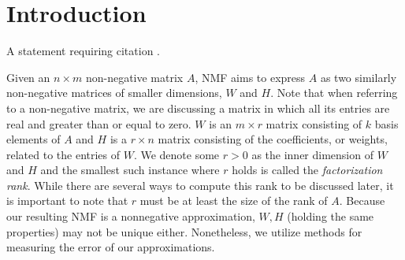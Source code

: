\documentclass[
10pt, %
a4paper, %
oneside, %
headinclude,footinclude, %
BCOR5mm, %
]{scrartcl}
\begin{document}

\let\thefootnote\relax{}


\newpage %


\section{Introduction}

A statement requiring citation \cite{Figueredo:2009dg}.

Given an $n\times m$ non-negative matrix $A$, NMF aims to express $A$ as two similarly non-negative matrices of smaller dimensions, $W$ and $H$.
Note that when referring to a non-negative matrix, we are discussing a matrix in which all its entries are real and greater than or equal to zero.
$W$ is an $m\times r$ matrix consisting of $k$ basis elements of $A$ and $H$  is a $r\times n$ matrix consisting of the coefficients, or weights, related to the entries of $W$.
We denote some $r>0$ as the inner dimension of $W$ and $H$ and the smallest such instance where $r$ holds is called the \emph{factorization rank}.
While there are several ways to compute this rank to be discussed later, it is important to note that $r$ must be at least the size of the rank of $A$.
Because our resulting NMF is a nonnegative approximation, $W,H$ (holding the same properties) may not be unique either.
Nonetheless, we utilize methods for measuring the error of our approximations.
 
\end{document}
